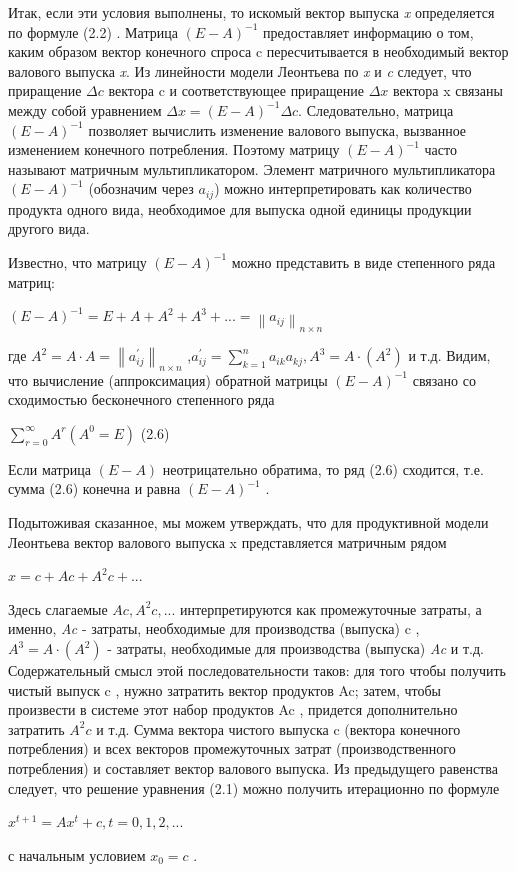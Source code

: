 \documentclass[12pt, 4paper]{book}
\begin{document}
{Итак, если эти условия выполнены, то искомый вектор выпуска \textit{x} определяется по формуле (2.2) . Матрица $(E-A)^{-1}$ предоставляет информацию о том, каким образом вектор конечного спроса c пересчитывается в необходимый вектор валового выпуска \textit{x}. Из линейности модели Леонтьева по \textit{x} и \textit{c} следует, что приращение $\Delta c$ вектора c и соответствующее приращение $\Delta x$ вектора x связаны между собой уравнением $\Delta x = (E-A)^{-1} \Delta c$. Следовательно, матрица $(E-A)^{-1}$ позволяет вычислить изменение валового выпуска, вызванное изменением конечного потребления. Поэтому матрицу $(E-A)^{-1}$ часто называют матричным мультипликатором. Элемент матричного мультипликатора $(E-A)^{-1}$ (обозначим через $a_{ij}$) можно интерпретировать как количество продукта одного вида, необходимое для выпуска одной единицы продукции другого вида.
\par

Известно, что матрицу $(E-A)^{-1}$ можно представить в виде степенного ряда матриц:
\begin{center}
$(E-A)^{-1}=E+A+A^2+A^3+...=\left\|a_{ij}\right\|_{n \times n}$
\end{center}
где $A^2 = A \cdot A = \left\|a_{ij}^{'}\right\|_{n \times n}$ ,$ a_{ij}^{'} = \sum\limits_{k=1}^{n}a_{ik}a_{kj}, A^3 = A \cdot (A^2)$ и т.д. Видим, что вычисление (аппроксимация) обратной матрицы $(E-A)^{-1}$ связано со сходимостью бесконечного степенного ряда 
\begin{center}
$\sum\limits_{r=0}^{\infty}A^r (A^0=E)$ (2.6)
\end{center}
\par

Если матрица $(E-A)$ неотрицательно обратима, то ряд (2.6) сходится, т.е. сумма (2.6) конечна и равна $(E-A)^{-1}$ .
\par

Подытоживая сказанное, мы можем утверждать, что для продуктивной модели Леонтьева вектор валового выпуска x представляется матричным рядом
\begin{center}
$x = c + Ac +A^2c+...$
\end{center}
\par

Здесь слагаемые $Ac,A^2c, ...$ интерпретируются как промежуточные затраты, а именно, \textit{Ac} - затраты, необходимые для производства (выпуска) c , $A^3 = A\cdot (A^2)$ - затраты, необходимые для производства (выпуска) \textit{Ac} и т.д. Содержательный смысл этой последовательности таков: для того чтобы получить чистый выпуск c , нужно затратить вектор продуктов Ac; затем, чтобы произвести в системе этот набор продуктов Ac , придется дополнительно затратить $A^2c$ и т.д. Сумма вектора чистого выпуска c (вектора конечного потребления) и всех векторов промежуточных затрат (производственного потребления) и составляет вектор валового выпуска. Из предыдущего равенства следует, что решение уравнения (2.1) можно получить итерационно по формуле
\begin{center}
$x^{t+1}=Ax^t+c, t=0,1,2,...$
\end{center}
с начальным условием $x_0 = c$ .
\par

}
\end{document}
